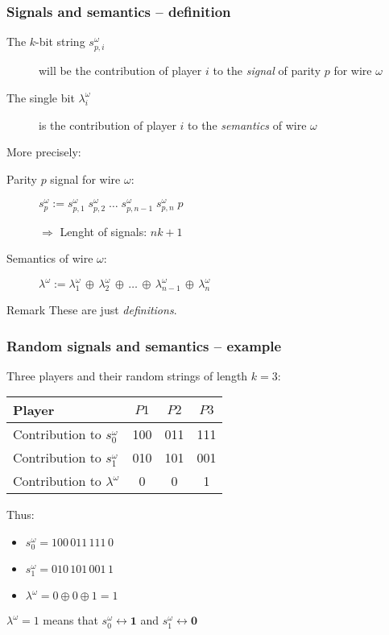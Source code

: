 \documentclass{beamer}
\begin{document}
\begin{frame}
  \frametitle{Signals and semantics -- definition}
  \begin{description}
  \item[The $k$-bit string $s_{p,i}^\omega$] will be the contribution of player $i$ to the \emph{signal} of parity $p$ for wire $\omega$
  \item[The single bit $\lambda^\omega_i$] is the contribution of player $i$ to the \emph{semantics} of wire $\omega$
  \end{description}
  \begin{block}{More precisely:}
    \begin{description}
    \item[Parity $p$ signal for wire $\omega$:] 
      $s_p^\omega := 
      s_{p,1}^\omega \; s_{p,2}^\omega \; \dots \; s_{p,n-1}^\omega \; s_{p,n}^\omega \; p$

      $\Rightarrow$ Lenght of signals: $nk+1$
    \item[Semantics of wire $\omega$:] 
      $\lambda^\omega := 
      \lambda_1^\omega \, \oplus \, \lambda_2^\omega \, \oplus \, \dots \, \oplus \, \lambda_{n-1}^\omega \, \oplus \, \lambda_n^\omega$
    \end{description}
  \end{block}
  \begin{alertblock}{Remark}
    These are just \emph{definitions}.
  \end{alertblock}
\end{frame}

\begin{frame}
  \frametitle{Random signals and semantics -- example}
  Three players and their random strings of length $k=3$:
  \begin{center}
    \begin{tabular}[h]{lccc}
      Player & $P1$ & $P2$ & $P3$ \\
      \hline
      Contribution to $s_0^\omega$ & 100 & 011 & 111 \\
      Contribution to $s_1^\omega$ & 010 & 101 & 001 \\
      Contribution to $\lambda^\omega$ & 0 & 0 & 1
    \end{tabular}
  \end{center}
  Thus:
  \begin{itemize}
  \item $s_0^\omega = 100\,011\,111\,0$
  \item $s_1^\omega = 010\,101\,001\,1$
  \item $\lambda^\omega = 0 \oplus 0 \oplus 1 = 1$
  \end{itemize}
  $\lambda^\omega=1$ means that $s_0^\omega \leftrightarrow \mathbf{1}$ and $s_1^\omega \leftrightarrow \mathbf{0}$
\end{frame}
\end{document}
